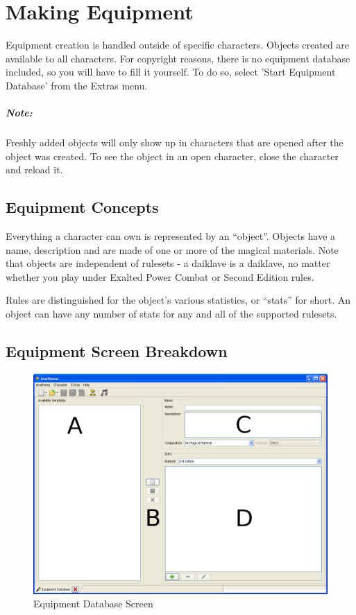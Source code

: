 \chapter{Making Equipment}
Equipment creation is handled outside of specific characters. Objects created are available to all characters. For copyright reasons, there is no equipment database included, so you will have to fill it yourself.  To do so, select 'Start Equipment Database' from the Extras menu.

\paragraph{Note:} Freshly added objects will only show up in characters that are opened after the object was created. To see the object in an open character, close the character and reload it.

\section{Equipment Concepts}
Everything a character can own is represented by an "`object"'. Objects have a name, description and are made of one or more of the magical materials. Note that objects are independent of rulesets - a daiklave is a daiklave, no matter whether you play under Exalted Power Combat or Second Edition rules.

Rules are distinguished for the object's various statistics, or "`stats"' for short. An object can have any number of stats for any and all of the supported rulesets.

\section{Equipment Screen Breakdown}
\begin{figure}
	\centering
		\includegraphics[width=1.00\textwidth]{images/Equipment.png}
	\caption{Equipment Database Screen}
	\label{fig:Equipment}
\end{figure}

